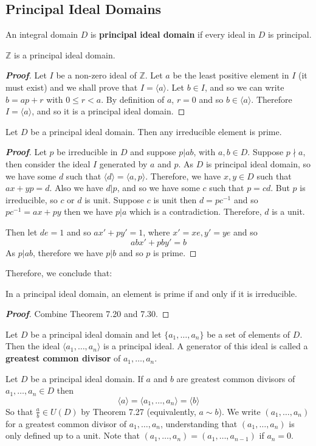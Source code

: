 \subsection{Principal Ideal Domains}
\begin{definition} An integral domain $D$ is {\bf principal ideal domain} if every ideal in $D$ is principal.
\end{definition}
\begin{theorem} $\mathbb{Z}$ is a principal ideal domain.
\end{theorem}
\begin{proof}[\bf Proof] Let $I$ be a non-zero ideal of $\mathbb{Z}$. Let $a$ be the least positive element in $I$ (it must exist) and we shall prove that $I=\langle a \rangle$. Let $b \in I$, and so we can write
$b=ap+r$ with $0 \le r <a$. By definition of $a$, $r=0$ and so $b \in \langle a \rangle$. Therefore $I=\langle a \rangle$, and so it is a principal ideal domain.
\end{proof}
\begin{theorem} Let $D$ be a principal ideal domain. Then any irreducible element is prime.
\end{theorem}
\begin{proof}[\bf Proof] Let $p$ be irreducible in $D$ and suppose $p|ab$, with $a,b \in D$. Suppose $p \nmid a$,
then consider the ideal $I$ generated by $a$ and $p$. As $D$ is principal ideal domain, so we have some $d$ such that
$\langle d \rangle =\langle a,p \rangle$. Therefore, we have $x,y \in D$ such that $ax+yp=d$. Also we have $d|p$, and so we have some $c$ such that $p=cd$. But $p$ is irreducible, so $c$ or $d$ is unit.
Suppose $c$ is unit then $d=pc^{-1}$ and so $pc^{-1}=ax+py$ then we have $p|a$ which is a contradiction. Therefore, $d$ is a unit.

Then let $de=1$ and so $ax'+py'=1$, where $x'=xe,y'=ye$ and so
$$abx'+pby'=b$$
As $p|ab$, therefore we have $p|b$ and so $p$ is prime.
\end{proof}
Therefore, we conclude that:
\begin{theorem} In a principal ideal domain, an element is prime if and only if it is irreducible.
\end{theorem}
\begin{proof}[\bf Proof] Combine Theorem 7.20 and 7.30.
\end{proof}
\begin{definition} Let $D$ be a principal ideal domain and let $\{a_1,\ldots,a_n\}$ be a set of elements of $D$. Then the ideal $\langle a_1,\ldots,a_n \rangle$ is a principal ideal. A generator of this ideal is called a {\bf greatest common divisor} of $a_1,\ldots,a_n$.
\end{definition}
Let $D$ be a principal ideal domain. If $a$ and $b$ are greatest common divisors of $a_1,\ldots,a_n \in D$ then
$$\langle a \rangle = \langle a_1,\ldots,a_n \rangle =\langle b \rangle$$
So that $\frac{a}{b} \in U(D)$ by Theorem 7.27 (equivalently, $a \sim b$). We write $(a_1,\ldots,a_n)$ for a greatest common divisor of $a_1,\ldots,a_n$, understanding that $(a_1,\ldots,a_n)$ is only defined up to a unit. Note that $(a_1,\ldots,a_n)=(a_1,\ldots,a_{n-1})$ if $a_n=0$.

